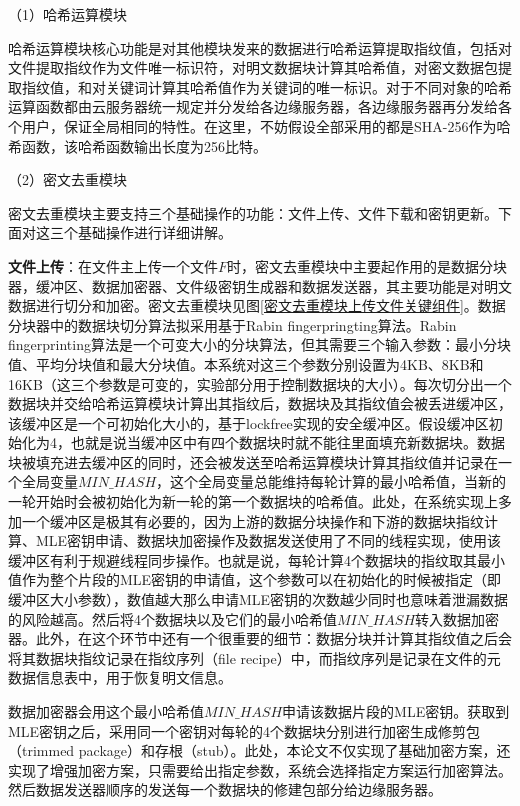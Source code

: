 \documentclass[promaster]{thesis-uestc}
\begin{document}
（1）哈希运算模块

哈希运算模块核心功能是对其他模块发来的数据进行哈希运算提取指纹值，包括对文件提取指纹作为文件唯一标识符，对明文数据块计算其哈希值，对密文数据包提取指纹值，和对关键词计算其哈希值作为关键词的唯一标识。对于不同对象的哈希运算函数都由云服务器统一规定并分发给各边缘服务器，各边缘服务器再分发给各个用户，保证全局相同的特性。在这里，不妨假设全部采用的都是SHA-256作为哈希函数，该哈希函数输出长度为256比特。

（2）密文去重模块

密文去重模块主要支持三个基础操作的功能：文件上传、文件下载和密钥更新。下面对这三个基础操作进行详细讲解。

\textbf{文件上传}：在文件主上传一个文件$F$时，密文去重模块中主要起作用的是数据分块器，缓冲区、数据加密器、文件级密钥生成器和数据发送器，其主要功能是对明文数据进行切分和加密。密文去重模块见图\ref{密文去重模块上传文件关键组件}。数据分块器中的数据块切分算法拟采用基于Rabin fingerpringting算法。Rabin fingerprinting算法是一个可变大小的分块算法，但其需要三个输入参数：最小分块值、平均分块值和最大分块值。本系统对这三个参数分别设置为4KB、8KB和16KB（这三个参数是可变的，实验部分用于控制数据块的大小）。每次切分出一个数据块并交给哈希运算模块计算出其指纹后，数据块及其指纹值会被丢进缓冲区，该缓冲区是一个可初始化大小的，基于lockfree实现的安全缓冲区。假设缓冲区初始化为4，也就是说当缓冲区中有四个数据块时就不能往里面填充新数据块。数据块被填充进去缓冲区的同时，还会被发送至哈希运算模块计算其指纹值并记录在一个全局变量$MIN\_HASH$，这个全局变量总能维持每轮计算的最小哈希值，当新的一轮开始时会被初始化为新一轮的第一个数据块的哈希值。此处，在系统实现上多加一个缓冲区是极其有必要的，因为上游的数据分块操作和下游的数据块指纹计算、MLE密钥申请、数据块加密操作及数据发送使用了不同的线程实现，使用该缓冲区有利于规避线程同步操作。也就是说，每轮计算4个数据块的指纹取其最小值作为整个片段的MLE密钥的申请值，这个参数可以在初始化的时候被指定（即缓冲区大小参数），数值越大那么申请MLE密钥的次数越少同时也意味着泄漏数据的风险越高。然后将4个数据块以及它们的最小哈希值$MIN\_HASH$转入数据加密器。此外，在这个环节中还有一个很重要的细节：数据分块并计算其指纹值之后会将其数据块指纹记录在指纹序列（file recipe）中，而指纹序列是记录在文件的元数据信息表中，用于恢复明文信息。

数据加密器会用这个最小哈希值$MIN\_HASH$申请该数据片段的MLE密钥。获取到MLE密钥之后，采用同一个密钥对每轮的4个数据块分别进行加密生成修剪包（trimmed package）和存根（stub）。此处，本论文不仅实现了基础加密方案，还实现了增强加密方案，只需要给出指定参数，系统会选择指定方案运行加密算法。然后数据发送器顺序的发送每一个数据块的修建包部分给边缘服务器。
\end{document}
